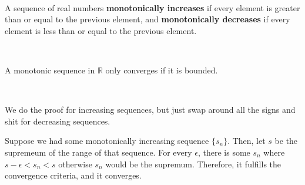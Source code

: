 \documentclass{article}
\begin{document}
\begin{definition}
\

A sequence of real numbers \textbf{monotonically increases} if every element is greater than or equal to the previous element, and \textbf{monotonically decreases} if every element is less than or equal to the previous element.   
\end{definition}

\begin{theorem}
\

A monotonic sequence in $\mathbb{R}$ only converges if it is bounded.
\end{theorem}

\begin{customproof}
\

We do the proof for increasing sequences, but just swap around all the signs and shit for decreasing sequences.

Suppose we had some monotonically increasing sequence $\{s_n\}$. Then, let $s$ be the supremeum of the range of that sequence. For every $\epsilon$, there is some $s_n$ where $s - \epsilon < s_n < s$ otherwise $s_n$ would be the supremum. Therefore, it fulfills the convergence criteria, and it converges.
\end{customproof}
\end{document}
